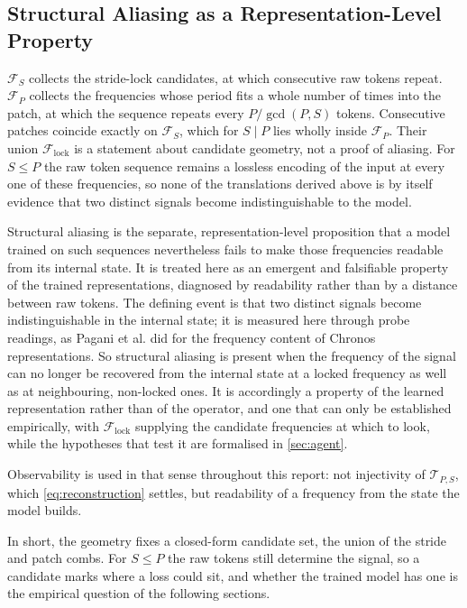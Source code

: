 \subsection{Structural Aliasing as a Representation-Level Property}
$\mathcal{F}_{S}$ collects the stride-lock candidates, at which consecutive raw tokens repeat. $\mathcal{F}_{P}$ collects the frequencies whose period fits a whole number of times into the patch, at which the sequence repeats every $P/\gcd(P,S)$ tokens. Consecutive patches coincide exactly on $\mathcal{F}_{S}$, which for $S \mid P$ lies wholly inside $\mathcal{F}_{P}$. Their union $\mathcal{F}_{\mathrm{lock}}$ is a statement about candidate geometry, not a proof of aliasing. For $S\le P$ the raw token sequence remains a lossless encoding of the input at every one of these frequencies, so none of the translations derived above is by itself evidence that two distinct signals become indistinguishable to the model.

Structural aliasing is the separate, representation-level proposition that a model trained on such sequences nevertheless fails to make those frequencies readable from its internal state. It is treated here as an emergent and falsifiable property of the trained representations, diagnosed by readability rather than by a distance between raw tokens. The defining event is that two distinct signals become indistinguishable in the internal state; it is measured here through probe readings, as Pagani et al\@. did for the frequency content of Chronos representations\autocite{paganiPreliminaryInsightsChronos2026}. So structural aliasing is present when the frequency of the signal can no longer be recovered from the internal state at a locked frequency as well as at neighbouring, non-locked ones. It is accordingly a property of the learned representation rather than of the operator, and one that can only be established empirically, with $\mathcal{F}_{\mathrm{lock}}$ supplying the candidate frequencies at which to look, while the hypotheses that test it are formalised in \autoref{sec:agent}.

Observability is used in that sense throughout this report: not injectivity of $\mathcal{T}_{P,S}$, which \autoref{eq:reconstruction} settles, but readability of a frequency from the state the model builds.

In short, the geometry fixes a closed-form candidate set, the union of the stride and patch combs. For $S\le P$ the raw tokens still determine the signal, so a candidate marks where a loss could sit, and whether the trained model has one is the empirical question of the following sections.
